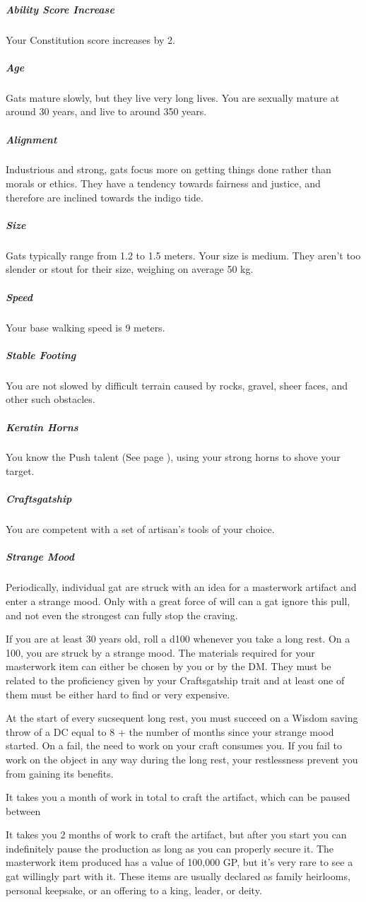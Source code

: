 \begin{linenumbers}
\subparagraph{Ability Score Increase} Your Constitution score increases by 2.

\subparagraph{Age} Gats mature slowly, but they live very long lives.
You are sexually mature at around 30 years, and live to around 350 years.

\subparagraph{Alignment} Industrious and strong, gats focus more on getting things done rather than morals or ethics.
They have a tendency towards fairness and justice, and therefore are inclined towards the indigo tide.

\subparagraph{Size} Gats typically range from 1.2 to 1.5 meters.
Your size is medium.
They aren't too slender or stout for their size, weighing on average 50 kg.

\subparagraph{Speed} Your base walking speed is 9 meters.

\subparagraph{Stable Footing} You are not slowed by difficult terrain caused by rocks, gravel, sheer faces, and other such obstacles.

\subparagraph{Keratin Horns} You know the Push talent (See page \pageref{tal::push}), using your strong horns to shove your target.

\subparagraph{Craftsgatship} You are competent with a set of artisan's tools of your choice.

\subparagraph{Strange Mood} Periodically, individual gat are struck with an idea for a masterwork artifact and enter a strange mood.
Only with a great force of will can a gat ignore this pull, and not even the strongest can fully stop the craving.

If you are at least 30 years old, roll a d100 whenever you take a long rest.
On a 100, you are struck by a strange mood.
The materials required for your masterwork item can either be chosen by you or by the DM.
They must be related to the proficiency given by your Craftsgatship trait and at least one of them must be either hard to find or very expensive.

At the start of every sucsequent long rest, you must succeed on a Wisdom saving throw of a DC equal to 8 + the number of months since your strange mood started.
On a fail, the need to work on your craft consumes you.
If you fail to work on the object in any way during the long rest, your restlessness prevent you from gaining its benefits.

It takes you a month of work in total to craft the artifact, which can be paused between

It takes you 2 months of work to craft the artifact, but after you start you can indefinitely pause the production as long as you can properly secure it.
The masterwork item produced has a value of 100,000 GP, but it's very rare to see a gat willingly part with it.
These items are usually declared as family heirlooms, personal keepsake, or an offering to a king, leader, or deity.


\end{linenumbers}
